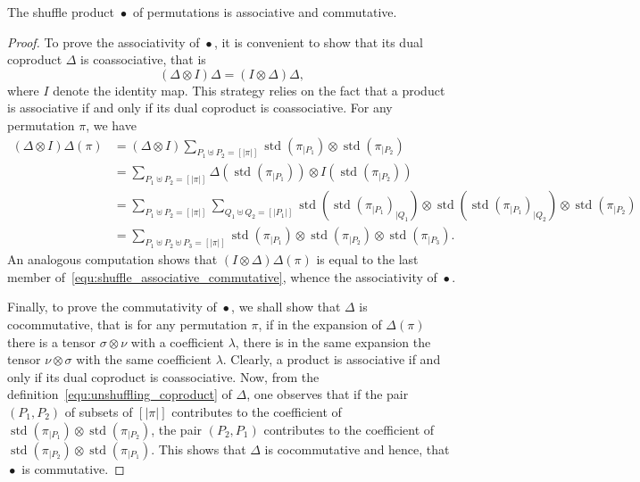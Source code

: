 \documentclass[a4paper,10pt]{llncs}
\DeclareMathOperator{\STD}{\mathrm{std}}
\DeclareMathOperator{\SHUFFLE}{\bullet}
\begin{document}
\begin{proposition} \label{prop:shuffle_associative_commutative}
    The shuffle product $\SHUFFLE$ of permutations is associative and
    commutative.
\end{proposition}
\begin{proof}
    To prove the associativity of $\SHUFFLE$, it is convenient to show
    that its dual coproduct $\Delta$ is coassociative, that is
    \begin{equation}
        (\Delta \otimes I) \Delta = (I \otimes \Delta) \Delta,
    \end{equation}
    where $I$ denote the identity map. This strategy relies on the fact
    that a product is associative if and only if its dual coproduct is
    coassociative. For any permutation $\pi$, we have
    \begin{equation} \begin{split}
    \label{equ:shuffle_associative_commutative}
        (\Delta \otimes I) \Delta(\pi) & =
        (\Delta \otimes I)
        \sum_{P_1 \uplus P_2 = [|\pi|]}
        \STD\left(\pi_{|P_1}\right) \otimes \STD\left(\pi_{|P_2}\right) \\
        & =
        \sum_{P_1 \uplus P_2 = [|\pi|]}
        \Delta\left(\STD\left(\pi_{|P_1}\right)\right)
        \otimes I\left(\STD\left(\pi_{|P_2}\right)\right) \\
        & =
        \sum_{P_1 \uplus P_2 = [|\pi|]}
        \sum_{Q_1 \uplus Q_2 = [|P_1|]}
        \STD\left(\STD\left(\pi_{|P_1}\right)_{|Q_1}\right)
        \otimes
        \STD\left(\STD\left(\pi_{|P_1}\right)_{|Q_2}\right)
        \otimes \STD\left(\pi_{|P_2}\right) \\
        & =
        \sum_{P_1 \uplus P_2 \uplus P_3 = [|\pi|]}
        \STD\left(\pi_{|P_1}\right) \otimes
        \STD\left(\pi_{|P_2}\right) \otimes
        \STD\left(\pi_{|P_3}\right).
    \end{split} \end{equation}
    An analogous computation shows that $(I \otimes \Delta) \Delta(\pi)$
    is equal to the last member of~\eqref{equ:shuffle_associative_commutative},
    whence the associativity of $\SHUFFLE$.
    \smallskip

    Finally, to prove the commutativity of $\SHUFFLE$, we shall show
    that $\Delta$ is cocommutative, that is for any permutation $\pi$,
    if in the expansion of $\Delta(\pi)$ there is a tensor
    $\sigma \otimes \nu$ with a coefficient $\lambda$, there is in the
    same expansion the tensor $\nu \otimes \sigma$ with the same
    coefficient $\lambda$. Clearly, a product is associative if and only
    if its dual coproduct is coassociative. Now, from the
    definition~\eqref{equ:unshuffling_coproduct} of $\Delta$, one
    observes that if the pair $(P_1, P_2)$ of subsets of $[|\pi|]$
    contributes to the coefficient of
    $\STD\left(\pi_{|P_1}\right) \otimes \STD\left(\pi_{|P_2}\right)$,
    the pair $(P_2, P_1)$ contributes to the coefficient of
    $\STD\left(\pi_{|P_2}\right) \otimes \STD\left(\pi_{|P_1}\right)$.
    This shows that $\Delta$ is cocommutative and hence, that $\SHUFFLE$
    is commutative.
\end{proof}
\medskip
\end{document}
